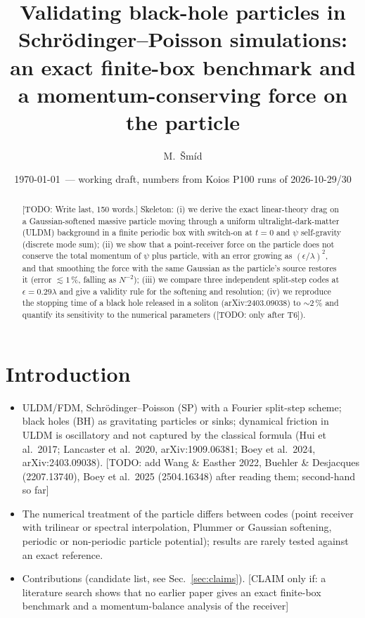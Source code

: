 \documentclass[11pt]{article}
\title{Validating black-hole particles in Schr\"odinger--Poisson simulations:\\
an exact finite-box benchmark and a momentum-conserving force on the particle}
\author{M.~\v{S}m\'id \and \todo{co-authors / affiliation}}
\date{\today\ --- working draft, numbers from Koios P100 runs of 2026-10-29/30}
\newcommand{\todo}[1]{{\color{red}[TODO: #1]}}
\newcommand{\claim}[1]{{\color{blue}[CLAIM only if: #1]}}
\begin{document}
\maketitle

\begin{abstract}
\todo{Write last, 150 words.} Skeleton: (i) we derive the exact linear-theory drag on a Gaussian-softened massive particle moving through a uniform ultralight-dark-matter (ULDM)
background in a finite periodic box with switch-on at $t=0$ and $\psi$ self-gravity (discrete mode sum); (ii) we show that a point-receiver force on the particle does not conserve the total momentum
of $\psi$ plus particle, with an error growing as $(\epsilon/\lambda)^2$, and that smoothing the force with the same Gaussian as the particle's source restores it (error $\lesssim 1\,\%$, falling as $N^{-2}$);
(iii) we compare three independent split-step codes at $\epsilon=0.29\lambda$ and give a validity rule for the softening and resolution; (iv) we reproduce the stopping time of a black hole released in a soliton
(arXiv:2403.09038) to $\sim 2\,\%$ and quantify its sensitivity to the numerical parameters (\todo{only after T6}).
\end{abstract}

\section{Introduction}
\begin{itemize}
\item ULDM/FDM, Schr\"odinger--Poisson (SP) with a Fourier split-step scheme; black holes (BH) as gravitating particles or sinks; dynamical friction in ULDM is oscillatory and not captured by the classical formula
(Hui et al.\ 2017; Lancaster et al.\ 2020, arXiv:1909.06381; Boey et al.\ 2024, arXiv:2403.09038). \todo{add Wang \& Easther 2022, Buehler \& Desjacques (2207.13740), Boey et al.\ 2025 (2504.16348) after reading them; second-hand so far}
\item The numerical treatment of the particle differs between codes (point receiver with trilinear or spectral interpolation, Plummer or Gaussian softening, periodic or non-periodic particle potential); results are rarely tested against an exact reference.
\item Contributions (candidate list, see Sec.~\ref{sec:claims}).
\claim{a literature search shows that no earlier paper gives an exact finite-box benchmark and a momentum-balance analysis of the receiver}
\end{itemize}
\end{document}
